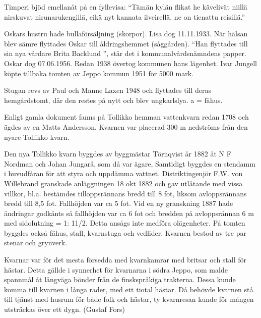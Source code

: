 Timperi bjöd emellanåt på en fyllevisa: ``Tämän kylän flikat he kävelivät niillä nirskuvat nirunarukengillä, eikä nyt kannata ilveirellä, ne on tienattu reisillä.''

Oskars hustru hade bullaförsäljning (skorpor). Lisa dog 11.11.1933. När hälsan blev sämre flyttades Oskar till åldringshemmet (såggården). ``Han flyttades till sin nya vårdare Brita Backlund '', står det i kommunalvårdsnämndens papper. Oskar dog 07.06.1956. Redan 1938 övertog kommunen hans lägenhet. Ivar Jungell köpte tillbaka tomten av Jeppo kommun 1951 för 5000 mark.

Stugan revs av Paul och Manne Laxen 1948 och flyttades till deras hemgårdstomt, där den restes på nytt och blev ungkarlslya. a = fähus.



%



Enligt gamla dokument fanns på Tollikko hemman vattenkvarn redan 1708 och ägdes av en Matts Andersson. Kvarnen var placerad 300 m nedströms från den nyare Tollikko kvarn.

Den nya Tollikko kvarn byggdes av byggmästar Törnqvist år 1882 åt N F Nordman och Johan Jungarå, som då var ägare, Samtidigt byggdes en stendamm i huvudfåran för att styra och uppdämma vattnet. Distriktingenjör F.W. 	von 	Willebrand granskade anläggningen 18 okt 1882 och gav utlåtande med vissa villkor, bl.a. bestämdes tilloppsrännans bredd till 8 fot, liksom avloppsrännans bredd till 8,5 fot. Fallhöjden var ca 5 fot. Vid en ny granskning 1887 hade ändringar	godkänts så fallhöjden var ca 6 fot och bredden på avloppsrännan 6 m med sidolutning = 1: 11/2. Detta ansågs inte medföra olägenheter. På tomten byggdes också fähus, stall, kvarnstuga och vedlider. Kvarnen bestod av tre par stenar och grynverk.

Kvarnar var för det mesta försedda med kvarnkamrar med britsar och stall för hästar. Detta gällde i synnerhet för kvarnarna i södra Jeppo, som malde spannmål åt långväga bönder från de finskspråkiga trakterna. Dessa kunde komma till kvarnen i långa rader, med ett tiotal hästar. Då behövde kvarnen stå till tjänst med husrum för både folk och hästar, ty kvarnresan kunde för mången utsträckas över ett dygn. (Gustaf Fors)


